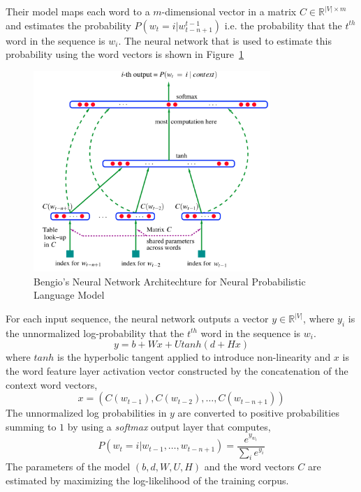 Their model maps each word to a $m$-dimensional vector in a matrix $C \in \mathbb{R}^{|V|\times m}$ and estimates the probability $P(w_{t} = i|w_{t-n+1}^{t-1})$ i.e. the probability that the $t^{th}$ word in the sequence is $w_{i}$. The neural network that is used to estimate this probability using the word vectors is shown in Figure~\ref{fig:nn:bengio}
\begin{figure}[t!]
    \centering
        \includegraphics[width=0.8\textwidth]{figs/bengio_nn.png}
    \caption{Bengio's Neural Network Architechture for Neural Probabilistic Language Model}
    \label{fig:nn:bengio}
\end{figure}
For each input sequence, the neural network outputs a vector $y \in \mathbb{R}^{|V|}$, where $y_{i}$ is the unnormalized log-probability that the $t^{th}$ word in the sequence is $w_{i}$.
\begin{equation}
y = b + Wx + Utanh(d + Hx)
\end{equation}
where $tanh$ is the hyperbolic tangent applied to introduce non-linearity and $x$ is the word feature layer activation vector constructed by the concatenation of the context word vectors,
\begin{equation}
x = (C(w_{t-1}), C(w_{t-2}), \ldots, C(w_{t-n+1}))
\end{equation}
The unnormalized log probabilities in $y$ are converted to positive probabilities summing to $1$ by using a \emph{softmax} output layer that computes, 
\begin{equation}
P(w_{t} = i | w_{t-1}, \ldots, w_{t-n+1}) = \frac{e^{y_{w_t}}}{\sum_{i}e^{y_{i}}}
\end{equation}
The parameters of the model $(b, d, W, U, H)$ and the word vectors $C$ are estimated by maximizing the log-likelihood of the training corpus.

